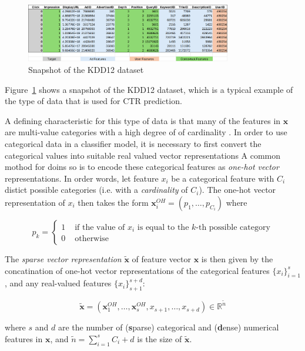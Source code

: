 \documentclass{mldsmsc}
\begin{document}
\begin{figure}[h]
\centering
\includegraphics[width=0.8\textwidth]{../figures/kdd12_snapshot.png}
\caption{Snapshot of the KDD12 dataset \cite{RefWorks:aden2012kdd}}
\label{fig:kdd12-snapshot}
\end{figure}

Figure~\ref{fig:kdd12-snapshot} shows a snapshot of the KDD12 dataset, which is a typical example of 
the type of data that is used for CTR prediction.

A defining characteristic for this type of data is that many of the features in $\mathbf{x}$ are multi-value categories with 
a high degree of of cardinality \citep{RefWorks:he2017neural}. In order to use categorical data
in a classifier model, it is necessary to first convert the categorical values into suitable real valued vector representations
A common mothod for doins so is to encode these categorical features
as \emph{one-hot vector} representations. In order words, let feature $x_i$ be
a categorical feature with $C_i$ distict possible categories (i.e. with a \emph{cardinality}
of $C_i$). The one-hot vector representation of $x_i$ then takes the form $\mathbf{x}_i^{OH}
= \left(p_1, \ldots, p_{C_i} \right)$ where

\[
p_k =
\begin{cases}
    1 & \text{ if the value of } x_i \text{ is equal to the } k \text{-th possible category}\\
    0 & \text{ otherwise}
\end{cases}
\]

The \emph{sparse vector representation} $\tilde{\mathbf{x}}$ of feature vector $\mathbf{x}$
is then given by the concatination of one-hot vector representations of the categorical features $\{x_i\}_{i=1}^{s}$,
and any real-valued features $\{x_i\}_{s+1}^{s+d}$:

\begin{equation}
    \label{eqn:sparse-vector}
    \tilde{\mathbf{x}} = \left( \mathbf{x}_1^{OH}, \ldots, \mathbf{x}_s^{OH}, x_{s+1}, \ldots, x_{s+d}\right) \in \mathbb{R}^{\tilde{n}}
\end{equation}

where $s$ and $d$ are the number of (\textbf{s}parse) categorical and (\textbf{d}ense) numerical
features in $\mathbf{x}$, and $\tilde{n} = \sum_{i=1}^{s}C_i + d$ is the size of $\tilde{\mathbf{x}}$.
\end{document}
